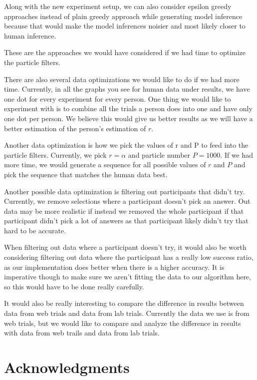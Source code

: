 \documentclass[12pt,letterpaper]{article}
\begin{document}
Along with the new experiment setup, we can also consider epsilon greedy approaches instead of plain greedy approach while generating model inference because that would make the model inferences noisier and most likely closer to human inference.

These are the approaches we would have considered if we had time to optimize the particle filters.

There are also several data optimizations we would like to do if we had more time. Currently, in all the graphs you see for human data under results, we have one dot for every experiment for every person. One thing we would like to experiment with is to combine all the trials a person does into one and have only one dot per person. We believe this would give us better results as we will have a better estimation of the person's estimation of $r$.

Another data optimization is how we pick the values of r and P to feed into the particle filters. Currently, we pick $r = \alpha$ and particle number $P = 1000$. If we had more time, we would generate a sequence for all possible values of $r$ and $P$ and pick the sequence that matches the human data best.

Another possible data optimization is filtering out participants that didn't try. Currently, we remove selections where a participant doesn't pick an answer. Out data may be more realistic if instead we removed the whole participant if that participant didn't pick a lot of answers as that participant likely didn't try that hard to be accurate.

When filtering out data where a participant doesn't try, it would also be worth considering filtering out data where the participant has a really low success ratio, as our implementation does better when there is a higher accuracy. It is imperative though to make sure we aren't fitting the data to our algorithm here, so this would have to be done really carefully.

It would also be really interesting to compare the difference in results between data from web trials and data from lab trials. Currently the data we use is from web trials, but we would like to compare and analyze the difference in results with data from web trails and data from lab trials.

\section{Acknowledgments}
\end{document}
